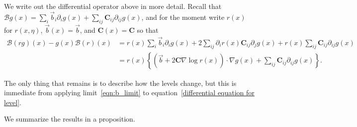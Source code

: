\documentclass[12pt]{article}
\newcommand{\grad}{\nabla}
\newcommand{\DG}{\mathcal{B}}  %
\newcommand{\meanq}{\vec b}    %
\newcommand{\covq}{\mathbf{C}}     %
\numberwithin{equation}{section}
\begin{document}
We write out the differential operator above in more detail.
Recall that $\DG g(x) = \sum_i \meanq_i \partial_i g(x) + \sum_{ij} \covq_{ij} \partial_{ij} g(x)$,
and for the moment write $r(x)$ for $r(x, \eta)$, $\meanq(x) = \meanq$, and $\covq(x) = \covq$
so that
\begin{align}
\DG(rg)(x) - g(x) \DG(r)(x)
    &= \nonumber
    r(x) \sum_i \meanq_i \partial_i g(x)
    + 2 \sum_{ij} \partial_i r(x) \covq_{ij} \partial_j g(x)
    + r(x) \sum_{ij} \covq_{ij} \partial_{ij} g(x) \\
    &= \label{eqn:limiting_generator}
    r(x) \left\{
        \left(
        \meanq
        + 2 \covq \grad \log r(x)
        \right)
        \cdot
        \grad g(x)
        +
        \sum_{ij} \covq_{ij} \partial_{ij} g(x)
    \right\} .
\end{align}

The only thing that remains is to describe how the levels change,
but this is immediate from applying limit~\eqref{eqn:b_limit}
to equation~\eqref{differential equation for level}.

We summarize the results in a proposition.
\end{document}
